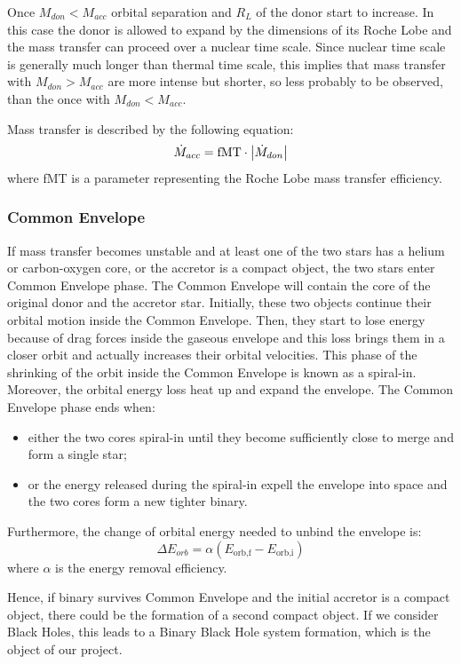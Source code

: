 \documentclass[prb,twocolumn,9pt]{revtex4-1}
\begin{document}
Once \(M_{don} < M_{acc}\) orbital separation and \(R_L\) of the donor start to increase. In this case the donor is allowed to expand by the dimensions of its Roche Lobe and the mass transfer can proceed over a nuclear time scale. 
Since nuclear time scale is generally much longer than thermal time scale, this implies that mass transfer with \( M_{don} > M_{acc}\) are more intense but shorter, so less probably to be observed, than the once with \(M_{don} < M_{acc}\).

Mass transfer is described by the following equation:
\begin{equation}
  \dot{M}_{acc} = \text{fMT} \cdot \abs{\dot{M}_{don}}
\end{equation}
where fMT is a parameter representing the Roche Lobe mass transfer efficiency.


\subsubsection{Common Envelope}
If mass transfer becomes unstable and at least one of the two stars has a helium or carbon-oxygen core, or the accretor is a compact object, the two stars enter Common Envelope phase. 
The Common Envelope will contain the core of the original donor and the accretor star. Initially, these two objects continue their orbital motion inside the Common Envelope. Then, they start to lose energy because of drag forces inside the gaseous envelope and this loss brings them in a closer orbit and actually increases their orbital velocities. This phase of the shrinking of the orbit inside the Common Envelope is known as a spiral-in.
Moreover, the orbital energy loss heat up and expand the envelope.
The Common Envelope phase ends when:
\begin{itemize}
    \item either the two cores spiral-in until they become sufficiently close to merge and form a single star;
    \item or the energy released during the spiral-in expell the envelope into space and the two cores form a new tighter binary.
\end{itemize}
Furthermore, the change of orbital energy needed to unbind the envelope is:
\begin{equation}
   \Delta E_{orb} = \alpha (E_{\text{orb,f}} - E_{\text{orb,i}})
\end{equation}
where $\alpha$ is the energy removal efficiency. 

Hence, if binary survives Common Envelope and the initial accretor is a compact object, there could be the formation of a second compact object. If we consider Black Holes, this leads to a Binary Black Hole system formation, which is the object of our project.
\end{document}
